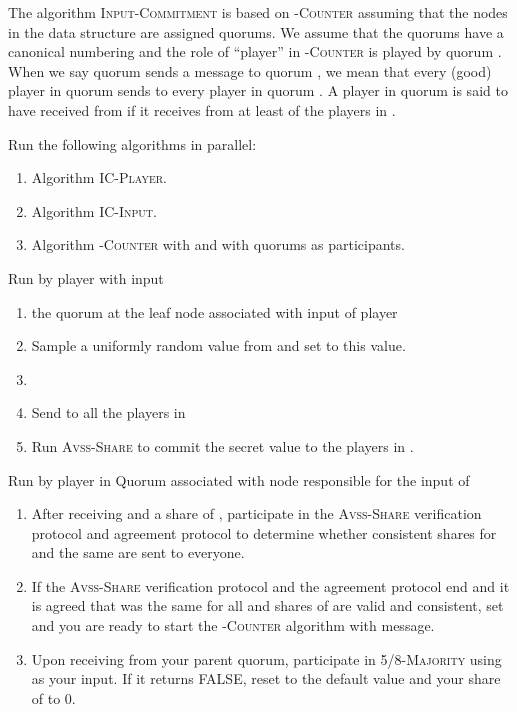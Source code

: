 \documentclass[10pt]{llncs}
\newcommand{\thresh}{5/8\xspace}
\newcommand{\flag}{\xspace}
\newcommand{\done}{\xspace}
\newcommand{\vssSh}{\textsc{Avss-Share}\xspace}
\newcommand{\tc}{\textsc{-Counter}\xspace}
\newcommand{\ic}{\textsc{Input-Commitment}\xspace}
\newcommand{\icPlayer}{\textsc{IC-Player}\xspace}
\newcommand{\icInput}{\textsc{IC-Input}\xspace}
\newcommand{\maj}{\thresh-\textsc{Majority}\xspace}
\begin{document}
The algorithm \ic is based on \tc assuming that the nodes in the data 
structure are assigned quorums. We assume that the quorums have a canonical 
numbering  and the role of ``player''  in \tc is 
played by 
quorum . When we say quorum  sends a message  to quorum
, we mean that every (good) player in quorum  sends  to every
player in quorum . A player in quorum  is said to have received
 from  if it receives  from at least  of the players
in .
\begin{algorithm}
\caption{\ic}\label{alg:aggr}
Run the following algorithms in parallel:
\begin{enumerate}
\item Algorithm \icPlayer.
\item Algorithm \icInput.
\item Algorithm \tc with  and with quorums as participants.
\end{enumerate}
\end{algorithm}

\begin{algorithm}
\caption{\icPlayer}\label{alg:icindividual}
{Run by player  with input }
\begin{enumerate}
\item  the quorum at the leaf node  associated with input of player  
\item Sample a uniformly random value  from  and set  to this value.
\item 
\item Send  to all the players in 
\item Run \vssSh to commit the secret value  to the players in .
\end{enumerate}
\end{algorithm}

\begin{algorithm}
\caption{\icInput}\label{alg:icinput}
{Run by player  in Quorum  associated with node  responsible for the input of }
\begin{enumerate}
\item After receiving   and a share of ,  
participate in the \vssSh verification protocol and agreement protocol 
to determine whether consistent shares for  and the same  are sent to everyone.
\item If the \vssSh verification protocol and the agreement protocol end and 
it is agreed that  was the same for all and shares of  are 
valid and consistent, set  and you are ready to start the \tc algorithm with \flag message.
\item Upon receiving \done from your parent quorum,  participate 
in \maj  using  as your input. If it returns FALSE, reset  to the default value and your share of  to 0.
\end{enumerate}
\end{algorithm}
\end{document}
